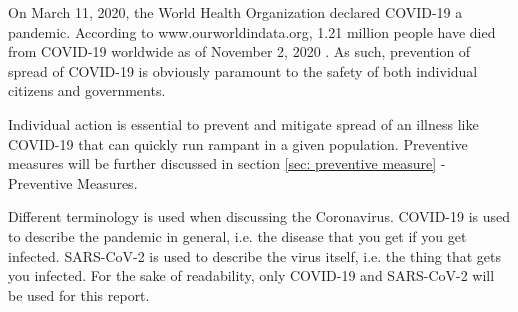 On March 11, 2020, the World Health Organization declared COVID-19 a pandemic. According to www.ourworldindata.org, 1.21 million people have died from COVID-19 worldwide as of November 2, 2020 \citep{ritchie_coronavirus_2020}. As such, prevention of spread of COVID-19 is obviously paramount to the safety of both individual citizens and governments.

Individual action is essential to prevent and mitigate spread of an illness like COVID-19 that can quickly run rampant in a given population. Preventive measures will be further discussed in section \ref{sec: preventive measure} - Preventive Measures.

Different terminology is used when discussing the Coronavirus. COVID-19 is used to describe the pandemic in general, i.e. the disease that you get if you get infected. SARS-CoV-2 is used to describe the virus itself, i.e. the thing that gets you infected. For the sake of readability, only COVID-19 and SARS-CoV-2 will be used for this report.



